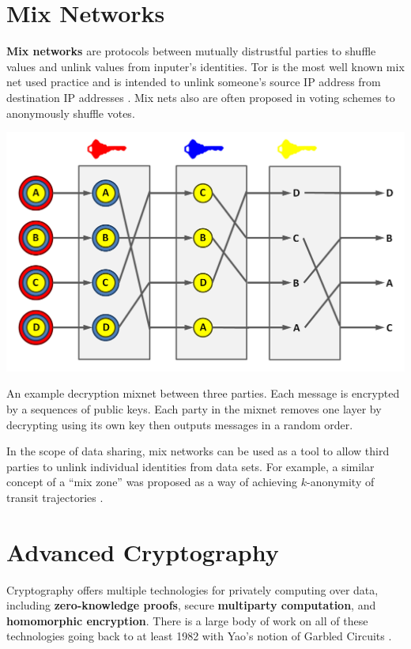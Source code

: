 \documentclass[nobib]{tufte-handout}
\begin{document}
\section{Mix Networks}

\textbf{Mix networks} \cite{DBLP:journals/cacm/Chaum81} are protocols between
mutually distrustful parties to shuffle values and unlink values from inputer’s
identities. Tor is the most well known mix net used practice and is intended to
unlink someone's source IP address from destination IP addresses
\cite{DBLP:conf/uss/DingledineMS04}. Mix nets also are often proposed in voting
schemes to anonymously shuffle votes.

\begin{marginfigure} \includegraphics[width=\linewidth]{mixnet} \caption{An
example decryption mixnet between three parties. Each message is encrypted by a
sequences of public keys. Each party in the mixnet removes one layer by
decrypting using its own key then outputs messages in a random order.}
\label{fig:mixnet} \end{marginfigure}

In the scope of data sharing, mix networks can be used as a tool to allow third
parties to unlink individual identities from data sets. For example, a similar
concept of a “mix zone” was proposed as a way of achieving $k$-anonymity of
transit trajectories \cite{freudiger2007mix}.

\section{Advanced Cryptography}

Cryptography offers multiple technologies for privately computing over data,
including \textbf{zero-knowledge proofs}, secure \textbf{multiparty
computation}, and \textbf{homomorphic encryption}. There is a large body of work
on all of these technologies going back to at least 1982 with Yao's notion of
Garbled Circuits \cite{DBLP:conf/focs/Yao82b}.
\end{document}
